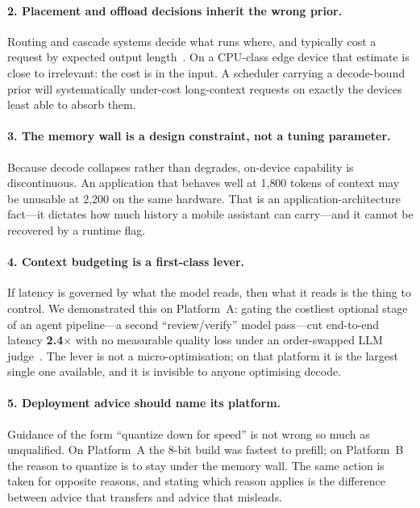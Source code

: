 \documentclass[sigconf,nonacm,10pt]{acmart}
\begin{document}
\paragraph{2. Placement and offload decisions inherit the wrong prior.}
Routing and cascade systems decide what runs where, and typically cost a request by expected output
length~\cite{chen2023frugalgpt,ong2024routellm,schuster2022calm}. On a CPU-class edge device that estimate is
close to irrelevant: the cost is in the input. A scheduler carrying a decode-bound prior will systematically
under-cost long-context requests on exactly the devices least able to absorb them.

\paragraph{3. The memory wall is a design constraint, not a tuning parameter.}
Because decode collapses rather than degrades, on-device capability is discontinuous. An application that
behaves well at 1{,}800 tokens of context may be unusable at 2{,}200 on the same hardware. That is an
application-architecture fact---it dictates how much history a mobile assistant can carry---and it cannot be
recovered by a runtime flag.

\paragraph{4. Context budgeting is a first-class lever.}
If latency is governed by what the model reads, then what it reads is the thing to control. We demonstrated this
on Platform~A: gating the costliest optional stage of an agent pipeline---a second ``review/verify'' model
pass---cut end-to-end latency \textbf{2.4$\times$} with no measurable quality loss under an order-swapped LLM
judge~\cite{zheng2023judging}. The lever is not a micro-optimisation; on that platform it is the largest single
one available, and it is invisible to anyone optimising decode.

\paragraph{5. Deployment advice should name its platform.}
Guidance of the form ``quantize down for speed'' is not wrong so much as unqualified. On Platform~A the 8-bit
build was fastest to prefill; on Platform~B the reason to quantize is to stay under the memory wall. The same
action is taken for opposite reasons, and stating which reason applies is the difference between advice that
transfers and advice that misleads.
\end{document}
